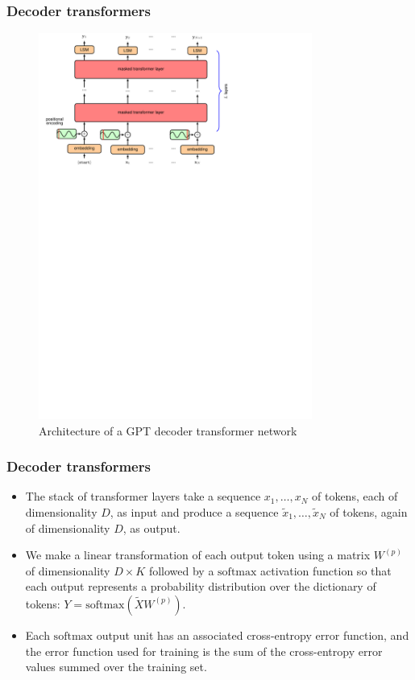 \documentclass{beamer}
\begin{document}
\begin{frame}
    \frametitle{Decoder transformers}
    \begin{figure}
        \caption{Architecture of a GPT decoder transformer network}
        \includegraphics[trim=0 16cm 0 0,clip=true,width=0.8\textwidth]{Figure_15.pdf}
    \end{figure}
\end{frame}

\begin{frame}
    \frametitle{Decoder transformers}
    \begin{itemize}
        \item The stack of transformer layers take a sequence $x_{1},\hdots,x_{N}$ of tokens, each of dimensionality $D$, as input and produce a sequence $\tilde{x}_{1},\hdots,\tilde{x}_{N}$ of tokens, again of dimensionality $D$, as output.
        \item We make a linear transformation of each output token using a matrix $W^{(p)}$ of dimensionality $D\times{}K$ followed by a $\mathrm{softmax}$ activation function so that each output represents a probability distribution over the dictionary of tokens: $Y=\mathrm{softmax}(\tilde{X}W^{(p)})$.
        \item Each $\mathrm{softmax}$ output unit has an associated cross-entropy error function, and the error function used for training is the sum of the cross-entropy error values summed over the training set.
    \end{itemize}
\end{frame}
\end{document}
